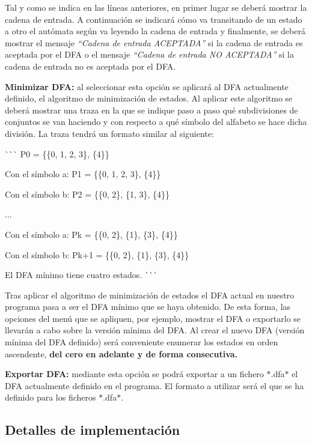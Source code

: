 \begin{DoxyItemize}
Tal y como se indica en las líneas anteriores, en primer lugar se deberá mostrar la cadena de entrada. A continuación se indicará cómo va transitando de un estado a otro el autómata según va leyendo la cadena de entrada y finalmente, se deberá mostrar el mensaje {\itshape “\+Cadena de entrada A\+C\+E\+P\+T\+A\+D\+A”} si la cadena de entrada es aceptada por el D\+FA o el mensaje {\itshape “\+Cadena de entrada NO A\+C\+E\+P\+T\+A\+D\+A”} si la cadena de entrada no es aceptada por el D\+FA.
\item {\bfseries Minimizar D\+FA\+:} al seleccionar esta opción se aplicará al D\+FA actualmente definido, el algoritmo de minimización de estados. Al aplicar este algoritmo se deberá mostrar una traza en la que se indique paso a paso qué subdivisiones de conjuntos se van haciendo y con respecto a qué símbolo del alfabeto se hace dicha división. La traza tendrá un formato similar al siguiente\+:

\`{}\`{}\`{} P0 = \{\{0, 1, 2, 3\}, \{4\}\}

Con el símbolo \textquotesingle{}a\textquotesingle{}\+: P1 = \{\{0, 1, 2, 3\}, \{4\}\}

Con el símbolo \textquotesingle{}b\textquotesingle{}\+: P2 = \{\{0, 2\}, \{1, 3\}, \{4\}\}

...

Con el símbolo \textquotesingle{}a\textquotesingle{}\+: Pk = \{\{0, 2\}, \{1\}, \{3\}, \{4\}\}

Con el símbolo \textquotesingle{}b\textquotesingle{}\+: Pk+1 = \{\{0, 2\}, \{1\}, \{3\}, \{4\}\}

El D\+FA mínimo tiene cuatro estados. \`{}\`{}\`{}

Tras aplicar el algoritmo de minimización de estados el D\+FA actual en nuestro programa pasa a ser el D\+FA mínimo que se haya obtenido. De esta forma, las opciones del menú que se apliquen, por ejemplo, mostrar el D\+FA o exportarlo se llevarán a cabo sobre la versión mínima del D\+FA. Al crear el nuevo D\+FA (versión mínima del D\+FA definido) será conveniente enumerar los estados en orden ascendente, {\bfseries del cero en adelante y de forma consecutiva.}
\item {\bfseries Exportar D\+FA\+:} mediante esta opción se podrá exportar a un fichero $\ast$.dfa$\ast$ el D\+FA actualmente definido en el programa. El formato a utilizar será el que se ha definido para los ficheros $\ast$.dfa$\ast$.
\end{DoxyItemize}

\subsection*{Detalles de implementación}


